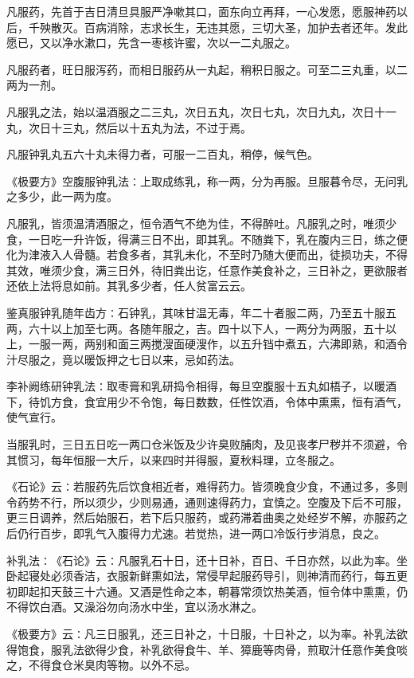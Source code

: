 \documentclass[a4paper,12pt,UTF8,twoside]{ctexbook}
\begin{document}
凡服药，先首于吉日清旦具服严净嗽其口，面东向立再拜，一心发愿，愿服神药以后，千殃散灭。百病消除，志求长生，无违其愿，三切大圣，加护去者还年。发此愿已，又以净水漱口，先含一枣核许蜜，次以一二丸服之。

凡服药者，旺日服泻药，而相日服药从一丸起，稍积日服之。可至二三丸重，以二两为一剂。

凡服乳之法，始以温酒服之二三丸，次日五丸，次日七丸，次日九丸，次日十一丸，次日十三丸，然后以十五丸为法，不过于焉。

凡服钟乳丸五六十丸未得力者，可服一二百丸，稍停，候气色。

《极要方》空腹服钟乳法∶上取成练乳，称一两，分为再服。旦服暮令尽，无问乳之多少，此一两为度。

凡服乳，皆须温清酒服之，恒令酒气不绝为佳，不得醉吐。凡服乳之时，唯须少食，一日吃一升许饭，得满三日不出，即其乳。不随粪下，乳在腹内三日，练之便化为津液入人骨髓。若食多者，其乳未化，不至时乃随大便而出，徒损功夫，不得其效，唯须少食，满三日外，待旧粪出讫，任意作美食补之，三日补之，更欲服者还依上法将息如前。其乳多少者，任人贫富云云。

鉴真服钟乳随年齿方∶石钟乳，其味甘温无毒，年二十者服二两，乃至五十服五两，六十以上加至七两。各随年服之，吉。四十以下人，一两分为两服，五十以上，一服一两，两别和面三两搅溲面硬溲作，以五升铛中煮五，六沸即熟，和酒令汁尽服之，竟以暖饭押之七日以来，忌如药法。

李补阙练研钟乳法∶取枣膏和乳研捣令相得，每旦空腹服十五丸如梧子，以暖酒下，待饥方食，食宜用少不令饱，每日数数，任性饮酒，令体中熏熏，恒有酒气，使气宣行。

当服乳时，三日五日吃一两口仓米饭及少许臭败脯肉，及见丧孝尸秽并不须避，令其惯习，每年恒服一大斤，以来四时并得服，夏秋料理，立冬服之。

《石论》云∶若服药先后饮食相近者，难得药力。皆须晚食少食，不通过多，多则令药势不行，所以须少，少则易通，通则速得药力，宜慎之。空腹及下后不可服，更三日调养，然后始服石，若下后只服药，或药滞着曲奥之处经岁不解，亦服药之后仍行百步，即乳气入腹得力尤速。若觉热，进一两口冷饭行步消息，良之。

补乳法∶《石论》云∶凡服乳石十日，还十日补，百日、千日亦然，以此为率。坐卧起寝处必须香洁，衣服新鲜熏如法，常侵早起服药导引，则神清而药行，每五更初即起扣天鼓三十六通。又酒是性命之本，朝暮常须饮热美酒，恒令体中熏熏，仍不得饮白酒。又澡浴勿向汤水中坐，宜以汤水淋之。

《极要方》云∶凡三日服乳，还三日补之，十日服，十日补之，以为率。补乳法欲得饱食，服乳法欲得少食，补乳欲得食牛、羊、獐鹿等肉骨，煎取汁任意作美食啖之，不得食仓米臭肉等物。以外不忌。
\end{document}
